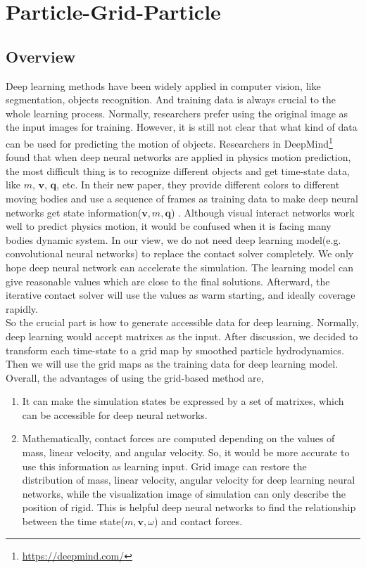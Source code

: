 \chapter{Particle-Grid-Particle}
\section{Overview}
    Deep learning methods have been widely applied in computer vision, like segmentation, objects recognition. And training data is always crucial to the whole learning process. Normally, researchers prefer using the original image as the input images for training. However, it is still not clear that what kind of data can be used for predicting the motion of objects. Researchers in DeepMind\footnote{\url{https://deepmind.com/}} found that when deep neural networks are applied in physics motion prediction, the most difficult thing is to recognize different objects and get time-state data, like $m$, $\pmb{v}$, $\pmb{q}$, etc. In their new paper, they provide different colors to different moving bodies and use a sequence of frames as training data to make deep neural networks get state information($\pmb{v}, m, \pmb{q}$) \cite{DBLP:journals/corr/WattersTWPBZ17}.  Although visual interact networks work well to predict physics motion, it would be confused when it is facing many bodies dynamic system. In our view, we do not need deep learning model(e.g. convolutional neural networks) to replace the contact solver completely. We only hope deep neural network can accelerate the simulation. The learning model can give reasonable values which are close to the final solutions. Afterward, the iterative contact solver will use the values as warm starting, and ideally coverage rapidly. \\

    So the crucial part is how to generate accessible data for deep learning. Normally, deep learning would accept matrixes as the input. After discussion, we decided to transform each time-state to a grid map by smoothed particle hydrodynamics. Then we will use the grid maps as the training data for deep learning model. Overall, the advantages of using the grid-based method are,
    \begin{enumerate}
        \item It can make the simulation states be expressed by a set of matrixes, which can be accessible for deep neural networks.
        \item Mathematically, contact forces are computed depending on the values of mass, linear velocity, and angular velocity. So, it would be more accurate to use this information as learning input. Grid image can restore the distribution of mass, linear velocity, angular velocity for deep learning neural networks, while the visualization image of simulation can only describe the position of rigid. This is helpful deep neural networks to find the relationship between the time state($m, \pmb{v}, \omega$) and contact forces.
    \end{enumerate}

